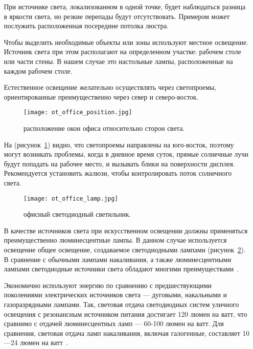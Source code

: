 При источнике света, локализованном в одной точке, будет наблюдаться разница в яркости света, но резкие перепады будут отсутствовать.
Примером может послужить расположенная посередине потолка люстра.

Чтобы выделить необходимые объекты или зоны используют местное освещение.
Источник света при этом располагают на определенном участке: рабочем столе или части стены.
В нашем случае это настольные лампы, расположенные на каждом рабочем столе.

Естественное освещение желательно осуществлять через светопроемы, ориентированные преимущественно через север и северо-восток.

\begin{figure}[ht]
\centering
  \texttt{[image: ot\_office\_position.jpg]}
  \caption{ расположение окон офиса относительно сторон света. }
  \label{fig:office_position}
\end{figure}

На (рисунок~\ref{fig:office_position}) видно, что светопроемы направлены на юго-восток, поэтому могут возникать проблемы, когда в дневное время суток, прямые солнечные лучи будут попадать на рабочее место, и вызывать блики на поверхности дисплея.
Рекомендуется установить жалюзи, чтобы контролировать поток солнечного света.

\begin{figure}[ht]
\centering
  \texttt{[image: ot\_office\_lamp.jpg]}
  \caption{ офисный светодиодный светильник. }
  \label{fig:office_lamp}
\end{figure}

В качестве источников света при искусственном освещении должны применяться преимущественно люминесцентные лампы.
В данном случае используется освещение общее освещение, создаваемое светодиодными лампами (рисунок~\ref{fig:office_lamp}).
В сравнение с обычными лампами накаливания, а также люминесцентными лампами светодиодные источники света обладают многими преимуществами~\cite{ot_diod_lamp}.

Экономично используют энергию по сравнению с предшествующими поколениями электрических источников света --- дуговыми, накальными и газоразрядными лампами.
Так, световая отдача светодиодных систем уличного освещения с резонансным источником питания достигает 120 люмен на ватт, что сравнимо с отдачей люминесцентных ламп --- 60-100 люмен на ватт.
Для сравнения, световая отдача ламп накаливания, включая галогенные, составляет 10—24 люмен на ватт~\cite{ot_diod_lamp}.

